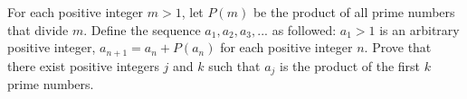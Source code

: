 For each positive integer $m> 1$, let $P (m)$ be the product of all prime numbers that divide $m$.
Define the sequence $a_1, a_2, a_3,...$ as followed:
$a_1> 1$ is an arbitrary positive integer,
$a_{n + 1} = a_n  + P (a_n)$ for each positive integer $n$.
Prove that there exist positive integers $j$ and $k$ such that $a_j$ is the product of the first $k$  prime numbers.